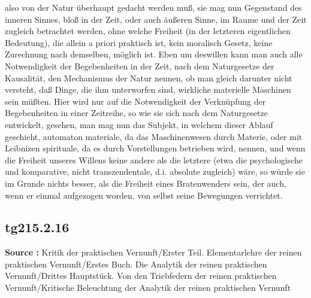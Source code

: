 \documentclass[a4paper,12pt,twoside]{book}
\begin{document}
also von der Natur überhaupt gedacht werden muß, sie mag nun Gegenstand des inneren Sinnes, bloß in der Zeit, oder auch äußeren Sinne, im Raume und der Zeit zugleich betrachtet werden, ohne welche Freiheit (in der letzteren eigentlichen Bedeutung), die allein a priori praktisch ist, kein moralisch Gesetz, keine Zurechnung nach demselben, möglich ist. Eben um deswillen kann man auch alle Notwendigkeit der Begebenheiten in der Zeit, nach dem Naturgesetze der Kausalität, den Mechanismus der Natur nennen, ob man gleich darunter nicht versteht, daß Dinge, die ihm unterworfen sind, wirkliche materielle Maschinen sein müßten. Hier wird nur auf die Notwendigkeit der Verknüpfung der Begebenheiten in einer Zeitreihe, so wie sie sich nach dem Naturgesetze entwickelt, gesehen, man mag nun das Subjekt, in welchem dieser Ablauf geschieht, automaton materiale, da das Maschinenwesen durch Materie, oder mit Leibnizen spirituale, da es durch Vorstellungen betrieben wird, nennen, und wenn die Freiheit unseres Willens keine andere als die letztere (etwa die psychologische und komparative, nicht transzendentale, d.i. absolute zugleich) wäre, so würde sie im Grunde nichts besser, als die Freiheit eines Bratenwenders sein, der auch, wenn er einmal aufgezogen worden, von selbst seine Bewegungen verrichtet. 
	
	\subsection*{tg215.2.16} 
	\textbf{Source : }Kritik der praktischen Vernunft/Erster Teil. Elementarlehre der reinen praktischen Vernunft/Erstes Buch. Die Analytik der reinen praktischen Vernunft/Drittes Hauptstück. Von den Triebfedern der reinen praktischen Vernunft/Kritische Beleuchtung der Analytik der reinen praktischen Vernunft\\  
	
\end{document}
